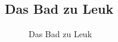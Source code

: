 \documentclass[
  letterpaper,
  DIV=11,
  numbers=noendperiod,
  landscape,
  a4paper,
  geometry:margin=1in]{scrartcl}
\begin{document}
\subsection{Das Bad zu Leuk}\label{das-bad-zu-leuk}

\begin{figure}


\caption{\label{fig-bad-zu-leuk}Das Bad zu Leuk}

\end{figure}%
\end{document}
